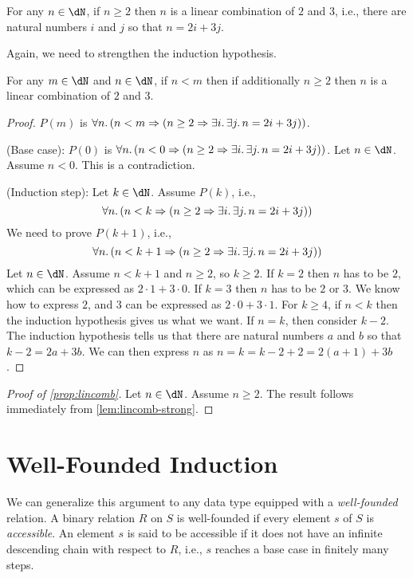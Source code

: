 \documentclass{amsart}
\begin{document}
\begin{prop}\label{prop:lincomb}
  For any $n \in \dN$, if $n \geq 2$ then $n$ is a linear combination of $2$ and $3$, i.e., there are natural numbers $i$ and $j$ so that $n = 2i + 3j$.
\end{prop}

Again, we need to strengthen the induction hypothesis.

\begin{lem}\label{lem:lincomb-strong}
  For any $m \in \dN$ and $n \in \dN$, if $n < m$ then if additionally $n \geq 2$ then $n$ is a linear combination of $2$ and $3$.
\end{lem}
\begin{proof}
  $P(m)$ is $\forall n.\,(n < m \Rightarrow (n \geq 2 \Rightarrow \exists i.\,\exists j.\,n = 2i + 3j))$.

  (Base case): $P(0)$ is $\forall n.\,(n < 0 \Rightarrow (n \geq 2 \Rightarrow \exists i.\,\exists j.\,n = 2i + 3j))$.
  Let $n \in \dN$.
  Assume $n < 0$.
  This is a contradiction.

  (Induction step): Let $k \in \dN$.
  Assume $P(k)$, i.e.,
  \[
    \forall n.\,(n < k \Rightarrow (n \geq 2 \Rightarrow \exists i.\,\exists j.\,n = 2i + 3j))
  \]
  We need to prove $P(k+1)$, i.e.,
  \[
    \forall n.\,(n < k + 1 \Rightarrow (n \geq 2 \Rightarrow \exists i.\,\exists j.\,n = 2i + 3j))
  \]
  Let $n \in \dN$.
  Assume $n < k + 1$ and $n \geq 2$, so $k \geq 2$.
  If $k = 2$ then $n$ has to be $2$, which can be expressed as $2 \cdot 1 + 3 \cdot 0$.
  If $k = 3$ then $n$ has to be $2$ or $3$.
  We know how to express $2$, and $3$ can be expressed as $2 \cdot 0 + 3 \cdot 1$.
  For $k \geq 4$, if $n < k$ then the induction hypothesis gives us what we want.
  If $n = k$, then consider $k - 2$.
  The induction hypothesis tells us that there are natural numbers $a$ and $b$ so that $k - 2 = 2a + 3b$.
  We can then express $n$ as $n = k = k - 2 + 2 = 2(a + 1) + 3b$.
\end{proof}

\begin{proof}[Proof of \cref{prop:lincomb}]
  Let $n \in \dN$.
  Assume $n \geq 2$.
  The result follows immediately from \cref{lem:lincomb-strong}.
\end{proof}

\section{Well-Founded Induction}
\label{sec:well-founded-induction}

We can generalize this argument to any data type equipped with a \emph{well-founded} relation.
A binary relation $R$ on $S$ is well-founded if every element $s$ of $S$ is \emph{accessible}.
An element $s$ is said to be accessible if it does not have an infinite descending chain with respect to $R$, i.e., $s$ reaches a base case in finitely many steps.
\end{document}
